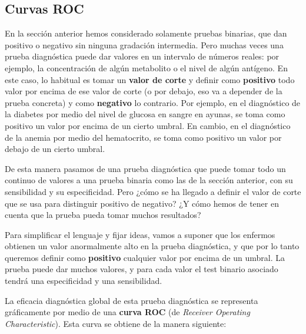 \documentclass[
]{book}
\theoremstyle{definition}
\theoremstyle{definition}
\theoremstyle{definition}
\theoremstyle{definition}
\theoremstyle{remark}
\begin{document}
\hypertarget{curvas-roc}{%
\subsection{Curvas ROC}\label{curvas-roc}}

En la sección anterior hemos considerado solamente pruebas binarias, que dan positivo o negativo sin ninguna gradación intermedia. Pero muchas veces una prueba diagnóstica puede dar valores en un intervalo de números reales: por ejemplo, la concentración de algún metabolito o el nivel de algún antígeno. En este caso, lo habitual es tomar un \textbf{valor de corte} y definir como \textbf{positivo} todo valor por encima de ese valor de corte (o por debajo, eso va a depender de la prueba concreta) y como \textbf{negativo} lo contrario. Por ejemplo, en el diagnóstico de la diabetes por medio del nivel de glucosa en sangre en ayunas, se toma como positivo un valor por encima de un cierto umbral. En cambio, en el diagnóstico de la anemia por medio del hematocrito, se toma como positivo un valor por debajo de un cierto umbral.

De esta manera pasamos de una prueba diagnóstica que puede tomar todo un continuo de valores a una prueba binaria como las de la sección anterior, con su sensibilidad y su especificidad. Pero ¿cómo se ha llegado a definir el valor de corte que se usa para distinguir positivo de negativo? ¿Y cómo hemos de tener en cuenta que la prueba pueda tomar muchos resultados?

Para simplificar el lenguaje y fijar ideas, vamos a suponer que los enfermos obtienen un valor anormalmente alto en la prueba diagnóstica, y que por lo tanto queremos definir como \textbf{positivo} cualquier valor por encima de un umbral. La prueba puede dar muchos valores, y para cada valor el test binario asociado tendrá una especificidad y una sensibilidad.

La eficacia diagnóstica global de esta prueba diagnóstica se representa gráficamente por medio de una \textbf{curva ROC} (de \emph{Receiver Operating Characteristic}). Esta curva se obtiene de la manera siguiente:
\end{document}
